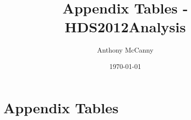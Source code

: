 \documentclass[11pt]{article}
\title{Appendix Tables - HDS2012Analysis}
\author{Anthony McCanny}
\date{\today}
\begin{document}
\maketitle

\section*{Appendix Tables}










\end{document}
